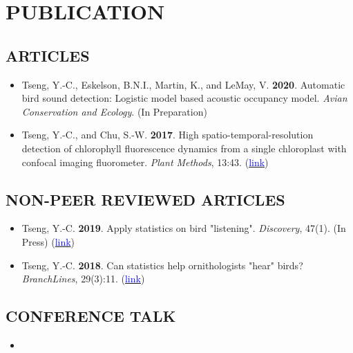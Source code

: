 \documentclass[11pt,letterpaper,sans]{moderncv}        %
\begin{document}
{%
\section{PUBLICATION}
\subsection{ARTICLES}
\begin{itemize}
\item{Tseng, Y.-C., Eskelson, B.N.I., Martin, K., and LeMay, V. \textbf{2020}. Automatic bird sound detection: Logistic model based acoustic occupancy model. \textit{Avian Conservation and Ecology}. (In Preparation)}
\vspace{3pt}


\item{Tseng, Y.-C., and Chu, S.-W. \textbf{2017}. High spatio-temporal-resolution detection of chlorophyll fluorescence dynamics from a single chloroplast with confocal imaging fluorometer. \textit{Plant Methods}, 13:43. (\href{https://doi.org/10.1186/s13007-017-0194-2}{\textcolor{blue}{link}})}
\end{itemize}

\subsection{NON-PEER REVIEWED ARTICLES}
\begin{itemize}
\item{Tseng, Y.-C. \textbf{2019}. Apply statistics on bird "listening". \textit{Discovery}}, 47(1). (In Press) (\href{https://naturevancouver.ca/publications/discovery/}{\textcolor{blue}{link}})
\vspace{3pt}

\item{Tseng, Y.-C. \textbf{2018}. Can statistics help ornithologists "hear" birds? \textit{BranchLines}}, 29(3):11. (\href{https://forestry.ubc.ca/files/2019/04/bl-29.3.pdf#page=11}{\textcolor{blue}{link}}) 
\vspace{3pt}
\end{itemize}

\subsection{CONFERENCE TALK}

\begin{itemize}
\item{}


\end{itemize}}
\end{document}
